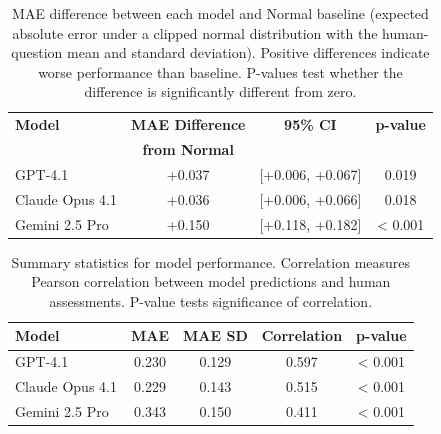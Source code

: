 \begin{table}[H]
\centering
\begin{tabular}{lccc}
\hline
\textbf{Model} & \textbf{MAE Difference} & \textbf{95\% CI} & \textbf{p-value} \\
 & \textbf{from Normal} & & \\
\hline
GPT-4.1 & +0.037 & [+0.006, +0.067] & 0.019 \\
Claude Opus 4.1 & +0.036 & [+0.006, +0.066] & 0.018 \\
Gemini 2.5 Pro & +0.150 & [+0.118, +0.182] & < 0.001 \\
\hline
\end{tabular}
\caption{MAE difference between each model and Normal baseline (expected absolute error under a clipped normal distribution with the human-question mean and standard deviation). Positive differences indicate worse performance than baseline. P-values test whether the difference is significantly different from zero.}
\label{tab:mae_vs_normal}
\end{table}
\FloatBarrier

\begin{table}[H]
\centering
\begin{tabular}{lcccc}
\hline
\textbf{Model} & \textbf{MAE} & \textbf{MAE SD} & \textbf{Correlation} & \textbf{p-value} \\
\hline
GPT-4.1 & 0.230 & 0.129 & 0.597 & < 0.001 \\
Claude Opus 4.1 & 0.229 & 0.143 & 0.515 & < 0.001 \\
Gemini 2.5 Pro & 0.343 & 0.150 & 0.411 & < 0.001 \\
\hline
\end{tabular}
\caption{Summary statistics for model performance. Correlation measures Pearson correlation between model predictions and human assessments. P-value tests significance of correlation.}
\label{tab:summary_stats}
\end{table}
\FloatBarrier